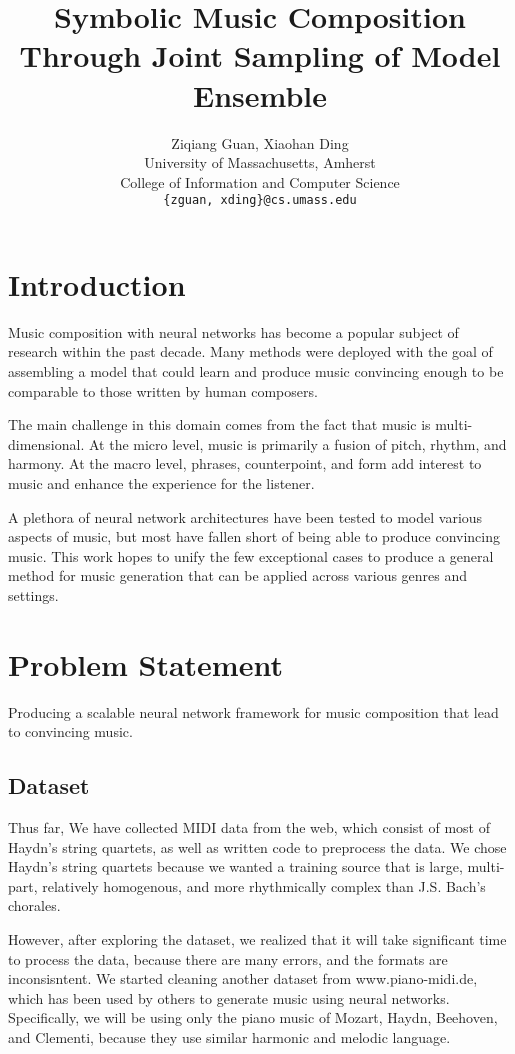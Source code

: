 \documentclass[10pt,twocolumn,letterpaper]{article}
\title{Symbolic Music Composition Through Joint Sampling of Model Ensemble}
\author{
  Ziqiang Guan, Xiaohan Ding\\
  University of Massachusetts, Amherst \\
  College of Information and Computer Science \\
  {\tt\small \{zguan, xding\}@cs.umass.edu}
}
\begin{document}
  \maketitle

  \section{Introduction}
  Music composition with neural networks has become a popular subject of research within the past decade. Many methods were deployed with the goal of assembling a model that could learn and produce music convincing enough to be comparable to those written by human composers.

  The main challenge in this domain comes from the fact that music is multi-dimensional. At the micro level, music is primarily a fusion of pitch, rhythm, and harmony. At the macro level, phrases, counterpoint, and form add interest to music and enhance the experience for the listener.

  A plethora of neural network architectures have been tested to model various aspects of music, but most have fallen short of being able to produce convincing music. This work hopes to unify the few exceptional cases to produce a general method for music generation that can be applied across various genres and settings.

  \section{Problem Statement}
  Producing a scalable neural network framework for music composition that lead to convincing music.

  \subsection{Dataset}
  Thus far, We have collected MIDI data from the web, which consist of most of Haydn's string quartets, as well as written code to preprocess the data. We chose Haydn's string quartets because we wanted a training source that is large, multi-part, relatively homogenous, and more rhythmically complex than J.S. Bach's chorales.

  However, after exploring the dataset, we realized that it will take significant time to process the data, because there are many errors, and the formats are inconsisntent. We started cleaning another dataset from www.piano-midi.de, which has been used by others to generate music using neural networks. Specifically, we will be using only the piano music of Mozart, Haydn, Beehoven, and Clementi, because they use similar harmonic and melodic language.
\end{document}

